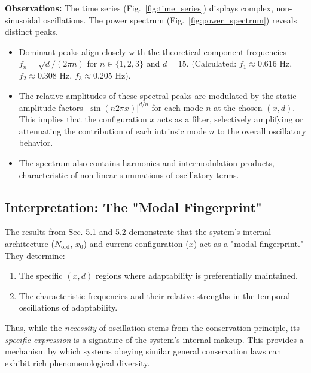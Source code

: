 \documentclass[11pt,a4paper]{article}
\begin{document}
\textbf{Observations:} The time series (Fig.~\ref{fig:time_series}) displays complex, non-sinusoidal oscillations. The power spectrum (Fig.~\ref{fig:power_spectrum}) reveals distinct peaks.
\begin{itemize}
    \item Dominant peaks align closely with the theoretical component frequencies $f_n = \sqrt{d}/(2\pi n)$ for $n \in \{1,2,3\}$ and $d=15$. (Calculated: $f_1 \approx 0.616$ Hz, $f_2 \approx 0.308$ Hz, $f_3 \approx 0.205$ Hz).
    \item The relative amplitudes of these spectral peaks are modulated by the static amplitude factors $|\sin(n2\pi x)|^{d/n}$ for each mode $n$ at the chosen $(x,d)$. This implies that the configuration $x$ acts as a filter, selectively amplifying or attenuating the contribution of each intrinsic mode $n$ to the overall oscillatory behavior.
    \item The spectrum also contains harmonics and intermodulation products, characteristic of non-linear summations of oscillatory terms.
\end{itemize}

\subsection{Interpretation: The "Modal Fingerprint"}

The results from Sec. 5.1 and 5.2 demonstrate that the system's internal architecture ($N_{\text{ord}}$, $x_0$) and current configuration ($x$) act as a "modal fingerprint." They determine:
\begin{enumerate}
    \item The specific $(x,d)$ regions where adaptability is preferentially maintained.
    \item The characteristic frequencies and their relative strengths in the temporal oscillations of adaptability.
\end{enumerate}

Thus, while the \textit{necessity} of oscillation stems from the conservation principle, its \textit{specific expression} is a signature of the system's internal makeup. This provides a mechanism by which systems obeying similar general conservation laws can exhibit rich phenomenological diversity.
\end{document}
